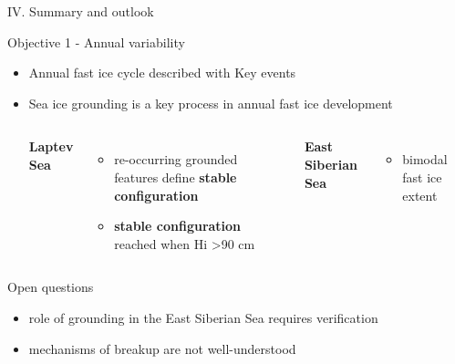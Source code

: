 \documentclass[8pt]{beamer}
\begin{document}
\setwatermark{\fontsize{125pt}{125pt}\selectfont{}}
\begin{frame}{IV. Summary and outlook}
	\begin{block}{Objective 1 -  Annual variability}
		\begin{itemize}
			\item Annual fast ice cycle described with Key events
			\item Sea ice grounding is a key process in annual fast ice development
				\begin{columns}
					\begin{center}
						\textbf{Laptev Sea}
					\end{center}
					\begin{itemize}
						\item re-occurring grounded features define \textbf{stable configuration}
						\item \textbf{stable configuration} reached when Hi \textgreater 90 cm
					\end{itemize}	
					
						\begin{center}
							\textbf{East Siberian Sea}
						\end{center}
						\begin{itemize}
							\item bimodal fast ice extent
						\end{itemize}	
								
						\end{columns}
			\end{itemize}
		\end{block}

		
	\begin{block}{Open questions}
		\begin{itemize}
			\item role of grounding in the East Siberian Sea requires verification
			\item mechanisms of breakup are not well-understood 
		\end{itemize}
	\end{block}
\end{frame}
\end{document}
